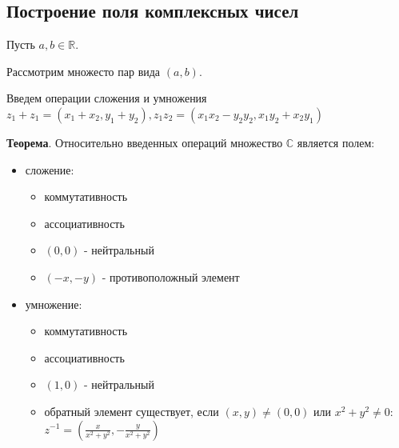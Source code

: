 \documentclass[a4paper]{article}
\begin{document}
    \newpage \begin{center}
                 \begin{Large}
                 \end{Large}
    \end{center}
    \subsection*{Построение поля комплексных чисел}
    Пусть $a,b \in \mathbb{R}$.

    Рассмотрим множесто пар вида $(a,b)$.

    Введем операции сложения и умножения $z_1 + z_1 = (x_1+x_2,y_1+y_2), z_1 z_2 = (x_1 x_2 -y_2 y_2, x_1 y_2 + x_2 y_1)$

    \begin{htheorem}
        \textbf{Теорема}. Относительно введенных операций множество $\mathbb{C}$ является полем:
    \end{htheorem}

    \begin{hproof}
        \begin{itemize}
            \item
            сложение:\begin{itemize}
                         \item коммутативность
                         \item ассоциативность
                         \item $(0,0)$ - нейтральный
                         \item $(-x,-y)$ - противоположный элемент
            \end{itemize}

            \item
            умножение: \begin{itemize}
                           \item коммутативность
                           \item ассоциативность
                           \item $(1,0)$ - нейтральный
                           \item обратный элемент существует, если $(x,y) \neq (0,0)$ или $\displaystyle x^2+y^2 \neq 0$: $z^{-1} = \left( \frac{x}{x^2+y^2},-\frac{y}{x^2+y^2} \right)$
            \end{itemize}


        \end{itemize}
    \end{hproof}
\end{document}
